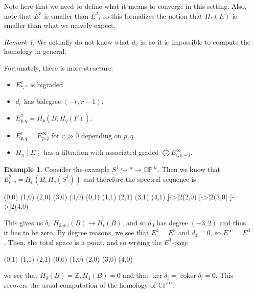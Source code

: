 \documentclass[leqno, openany]{memoir}
\theoremstyle{definition}
\newtheorem{exm}[thm]{Example}
\theoremstyle{remark}
\newtheorem{rmk}[thm]{Remark}
\theoremstyle{plain}
\theoremstyle{definition}
\theoremstyle{remark}
\newcommand{\C}{\mathbb{C}}
\newcommand{\Z}{\mathbb{Z}}
\renewcommand{\P}{\mathbb{P}}
\DeclareMathOperator{\coker}{coker}
\begin{document}
Note here that we need to define what it means to converge in this setting. Also, note that $E^3$ is smaller than $E^2$, so this formalizes the notion that $H_*(E)$ is smaller than what we naively expect.

\begin{rmk}
    We actually do not know what $d_2$ is, so it is impossible to compute the homology in general.
\end{rmk}

Fortunately, there is more structure:
\begin{itemize}
    \item $E^r_{*,*}$ is bigraded.
    \item $d_r$ has bidegree $(-r, r-1)$.
    \item $E_{p,q}^2 = H_p(B; H_q(F))$.
    \item $E_{p,q}^r = E_{p,q}^{\infty}$ for $r \gg 0$ depending on $p,q$.
    \item $H_n(E)$ has a filtration with associated graded $\bigoplus E_{i, n-i}^{\infty}$.
\end{itemize}

\begin{exm}
    Consider the example $S^1 \hookrightarrow * \to \C\P^{\infty}$. Then we know that $E_{p,q}^2 = H_p(B, H_q(S^1))$ and therefore the spectral sequence is
    \begin{center}
    \begin{sseqdata}[classes={draw=none},name=cpinf,homological Serre grading,xscale=1.8, y axis gap = 2em]
        \class["H_0(B)"](0,0)
        \class["H_1(B)"](1,0)
        \class["H_2(B)"](2,0)
        \class["H_3(B)"](3,0)
        \class["\ldots"](4,0)
        \class["H_0(B)"](0,1)
        \class["H_1(B)"](1,1)
        \class["H_2(B)"](2,1)
        \class["H_3(B)"](3,1)
        \class["\ldots"](4,1)
        \d[->]2(2,0)
        \d[->]2(3,0)
        \d[->]2(4,0)
    \end{sseqdata}
    \printpage[name=cpinf,page=2]
    \end{center}
    This gives us $\delta_i \colon H_{2+i}(B) \to H_i(B)$, and so $d_3$ has degree $(-3, 2)$ and thus it has to be zero. By degree reasons, we see that $E^4 = E^3$ and $d_4 = 0$, so $E^{\infty} = E^3$. Then, the total space is a point, and so writing the $E^3$-page
    \begin{center}
        \begin{sseqdata}[classes={draw=none},name=cpinf3,homological Serre grading,xscale=1.8, y axis gap = 2em]
            \class["\coker \delta_0"](0,1)
            \class["\coker \delta_1"](1,1)
            \class["\coker \delta_2"](2,1)
            \class["H_0(B)"](0,0)
            \class["H_1(B)"](1,0)
            (2,0)
            (3,0)
            (4,0)
        \end{sseqdata}
        \printpage[name=cpinf3, page=3]
    \end{center}
    we see that $H_0(B) = \Z, H_1(B) = 0$ and that $\ker \delta_i = \operatorname{coker} \delta_i = 0$. This recovers the usual computation of the homology of $\C\P^{\infty}$.
\end{exm}
\end{document}
